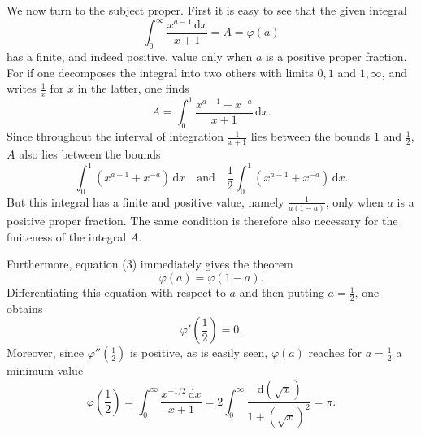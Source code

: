 \documentclass[11pt]{article}
\newcommand{\dd}{\,\mathrm d}
\begin{document}
We now turn to the subject proper. First it is easy to see that the given integral
\begin{equation}
\int_0^\infty\frac{x^{a-1}\dd x}{x+1}=A=\varphi(a)
\tag{2}
\end{equation}
has a finite, and indeed positive, value only when $a$ is a positive proper fraction. For if one decomposes the integral into two others with limits $0,1$ and $1,\infty$, and writes $\frac1x$ for $x$ in the latter, one finds
\begin{equation}
A=\int_0^1\frac{x^{a-1}+x^{-a}}{x+1}\dd x.
\tag{3}
\end{equation}
Since throughout the interval of integration $\frac1{x+1}$ lies between the bounds $1$ and $\frac12$, $A$ also lies between the bounds
\[
\int_0^1(x^{a-1}+x^{-a})\dd x
\quad\text{and}\quad
\frac12\int_0^1(x^{a-1}+x^{-a})\dd x.
\]
But this integral has a finite and positive value, namely $\frac1{a(1-a)}$, only when $a$ is a positive proper fraction. The same condition is therefore also necessary for the finiteness of the integral $A$.

Furthermore, equation (3) immediately gives the theorem
\begin{equation}
\varphi(a)=\varphi(1-a).
\tag{4}
\end{equation}
Differentiating this equation with respect to $a$ and then putting $a=\frac12$, one obtains
\begin{equation}
\varphi'\!\left(\frac12\right)=0.
\tag{5}
\end{equation}
Moreover, since $\varphi''(\frac12)$ is positive, as is easily seen, $\varphi(a)$ reaches for $a=\frac12$ a minimum value
\begin{equation}
\varphi\!\left(\frac12\right)
=\int_0^\infty\frac{x^{-1/2}\dd x}{x+1}
=2\int_0^\infty\frac{\dd(\sqrt{x})}{1+(\sqrt{x})^2}=\pi.
\tag{6}
\end{equation}
\end{document}
